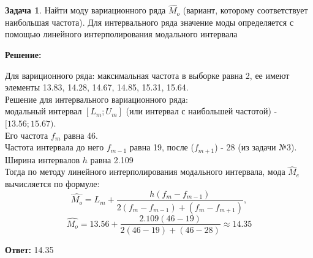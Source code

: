 \documentclass[a4paper,12pt]{article}
\theoremstyle{definition}
\newtheorem{problem}{Задача}\setlength{\parindent}{0pt}
\newenvironment{solution}
{\begin{shaded}\textbf{Решение:}\par\setlength{\parindent}{0pt}}
{\end{shaded}}
\newenvironment{answer}
{\par\noindent\textbf{Ответ:} }
{\par}
\begin{document}
\vspace{8pt}
\begin{problem}
    Найти моду вариационного ряда \(\hat{M_o}\) (вариант, которому соответствует
    наибольшая частота). Для интервального ряда значение моды определяется с
    помощью линейного интерполирования модального интервала
    
        \begin{solution}
            Для вариционного ряда: максимальная частота в выборке равна 2, ее имеют элементы
            13.83, 14.28, 14.67, 14.85, 15.31, 15.64.  \\

            Решение для интервального вариационного ряда: \\
            модальный интервал \([L_m; U_m]\) (или интервал с наибольшей частотой) - \( [13.56; 15.67) \). \\
            Его частота \(f_m\) равна 46. \\
            Частота интервала до него \(f_{m-1}\) равна 19, после (\(f_{m+1}\)) - 28 (из задачи №3).\\
            Ширина интервалов \(h\) равна 2.109 \\
            Тогда по методу линейного интерполирования модального интервала, мода \(\hat M_e\) вычисляется по формуле:
            \[ \hat{M_o} = L_m + \frac{h(f_m - f_{m-1})}{2(f_m - f_{m-1}) + (f_m - f_{m+1})}, \]
            \[ \hat{M_o} = 13.56 + \frac{2.109(46 - 19)}{2(46 - 19) + (46 - 28)} \approx 14.35\]
        \end{solution}
    
        \begin{answer}
            14.35
        \end{answer}
    
    \end{problem}
\end{document}

